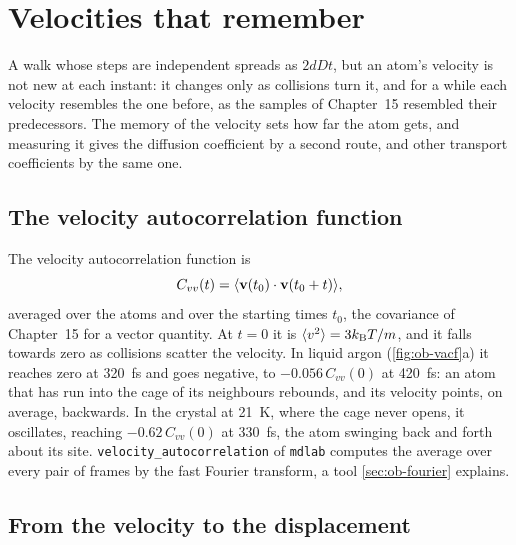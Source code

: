 \section{Velocities that remember}
\label{sec:ob-vacf}

A walk whose steps are independent spreads as $2dDt$, but an atom's
velocity is not new at each instant: it changes only as collisions turn
it, and for a while each velocity resembles the one before, as the
samples of Chapter~15 resembled their predecessors. The memory of the
velocity sets how far the atom gets, and measuring it gives the diffusion
coefficient by a second route, and other transport coefficients by the
same one.

\subsection*{The velocity autocorrelation function}

The velocity autocorrelation function is
\begin{equation*}
   C_{vv}(t) = \langle \bm{\mathrm{v}}(t_0)\cdot\bm{\mathrm{v}}(t_0 + t) \rangle ,
\end{equation*}
averaged over the atoms and over the starting times $t_0$, the
covariance of Chapter~15 for a vector quantity. At $t = 0$ it is
$\langle v^2 \rangle = 3k_{\mathrm{B}} T/m$, and it falls towards zero as collisions scatter
the velocity. In liquid argon (\cref{fig:ob-vacf}a) it reaches zero at
\SI{320}{\femto\second} and goes negative, to $-0.056\,C_{vv}(0)$ at
\SI{420}{\femto\second}: an atom that has run into the cage of its
neighbours rebounds, and its velocity points, on average, backwards. In
the crystal at \SI{21}{\kelvin}, where the cage never opens, it
oscillates, reaching $-0.62\,C_{vv}(0)$ at \SI{330}{\femto\second}, the
atom swinging back and forth about its site. \texttt{velocity\_autocorrelation}
of \texttt{mdlab} computes the average over every pair of frames by the
fast Fourier transform, a tool \cref{sec:ob-fourier} explains.

\subsection*{From the velocity to the displacement}

